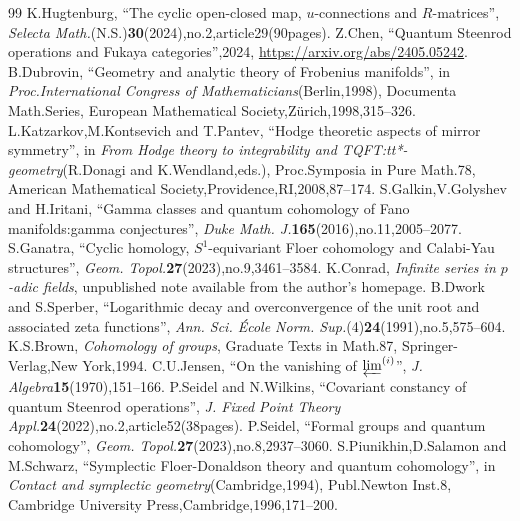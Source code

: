 \documentclass[10pt,a4paper]{amsart}
\theoremstyle{plain}
\theoremstyle{definition}
\begin{document}
\begin{thebibliography}{99}
 K.Hugtenburg, ``The cyclic open-closed map, $u$-connections and $R$-matrices'', \emph{Selecta Math.}(N.S.)\textbf{30}(2024),no.2,article29(90pages).
 Z.Chen, ``Quantum Steenrod operations and Fukaya categories'',2024, \url{https://arxiv.org/abs/2405.05242}.
 B.Dubrovin, ``Geometry and analytic theory of Frobenius manifolds'', in \emph{Proc.International Congress of Mathematicians}(Berlin,1998), Documenta Math.Series, European Mathematical Society,Zürich,1998,315--326.
 L.Katzarkov,M.Kontsevich and T.Pantev, ``Hodge theoretic aspects of mirror symmetry'', in \emph{From Hodge theory to integrability and TQFT:tt*-geometry}(R.Donagi and K.Wendland,eds.), Proc.Symposia in Pure Math.78, American Mathematical Society,Providence,RI,2008,87--174.
 S.Galkin,V.Golyshev and H.Iritani, ``Gamma classes and quantum cohomology of Fano manifolds:gamma conjectures'', \emph{Duke Math. J.}\textbf{165}(2016),no.11,2005--2077.
 S.Ganatra, ``Cyclic homology, $S^1$-equivariant Floer cohomology and Calabi-Yau structures'', \emph{Geom. Topol.}\textbf{27}(2023),no.9,3461--3584.
 K.Conrad, \emph{Infinite series in $p$-adic fields}, unpublished note available from the author's homepage.
 B.Dwork and S.Sperber, ``Logarithmic decay and overconvergence of the unit root and associated zeta functions'', \emph{Ann. Sci. \'Ecole Norm. Sup.}(4)\textbf{24}(1991),no.5,575--604.
 K.S.Brown, \emph{Cohomology of groups}, Graduate Texts in Math.87, Springer-Verlag,New York,1994.
 C.U.Jensen, ``On the vanishing of $\varprojlim^{(i)}$'', \emph{J. Algebra}\textbf{15}(1970),151--166.
 P.Seidel and N.Wilkins, ``Covariant constancy of quantum Steenrod operations'', \emph{J. Fixed Point Theory Appl.}\textbf{24}(2022),no.2,article52(38pages).
 P.Seidel, ``Formal groups and quantum cohomology'', \emph{Geom. Topol.}\textbf{27}(2023),no.8,2937--3060.
 S.Piunikhin,D.Salamon and M.Schwarz, ``Symplectic Floer-Donaldson theory and quantum cohomology'', in \emph{Contact and symplectic geometry}(Cambridge,1994), Publ.Newton Inst.8, Cambridge University Press,Cambridge,1996,171--200.
\end{thebibliography}
\end{document}
